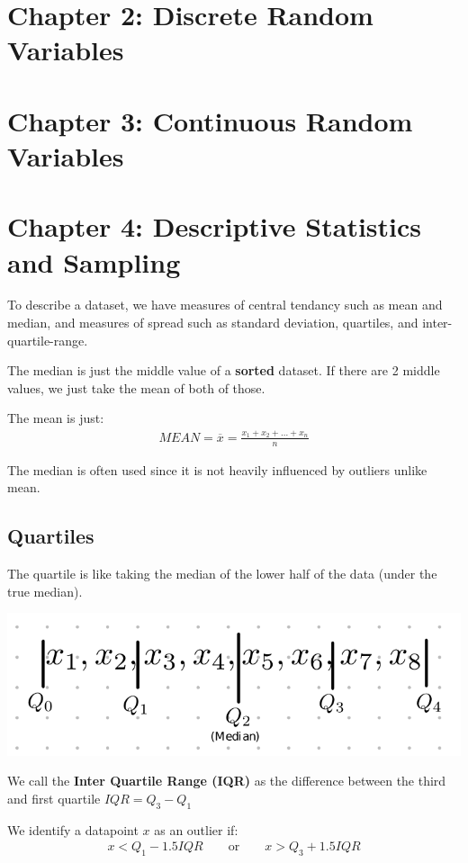 \documentclass[12pt,letterpaper]{article} \usepackage{amsmath} \usepackage{graphicx} \usepackage[margin=1in]{geometry} \usepackage{longtable}  \usepackage{amssymb}
\begin{document}
	\section{Chapter 2: Discrete Random Variables}
	
	\section{Chapter 3: Continuous Random Variables}
	
	\section{Chapter 4: Descriptive Statistics and Sampling}
	To describe a dataset, we have measures of central tendancy such as mean and median, and measures of spread such as standard deviation, quartiles, and inter-quartile-range. 
	
	The median is just the middle value of a \textbf{sorted} dataset. If there are 2 middle values, we just take the mean of both of those. 
	
	The mean is just:
	\begin{align*}
		MEAN = \overline{x} = \frac{x_1 + x_2 + ... + x_n}{n}
	\end{align*}

	The median is often used since it is not heavily influenced by outliers unlike mean. 
	
	\subsection{Quartiles}
	The quartile is like taking the median of the lower half of the data (under the true median). 
	\begin{center}
		\includegraphics[width=0.4\linewidth]{quartiles}
	\end{center}
	We call the \textbf{Inter Quartile Range (IQR)} as the difference between the third and first quartile $IQR = Q_3-Q_1$

	We identify a datapoint $x$ as an outlier if:
	\begin{align*}
		x < Q_1 - 1.5IQR \qquad \text{or} \qquad x>Q_3 + 1.5IQR
	\end{align*}
\end{document}
